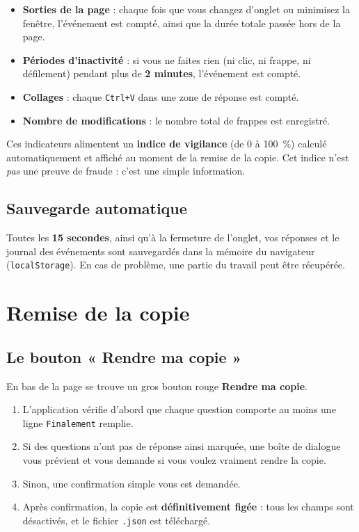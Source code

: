 \documentclass[11pt,a4paper]{article}
\begin{document}
\begin{itemize}
  \item \textbf{Sorties de la page} : chaque fois que vous changez d'onglet ou
        minimisez la fenêtre, l'événement est compté, ainsi que la durée totale passée
        hors de la page.
  \item \textbf{Périodes d'inactivité} : si vous ne faites rien (ni clic, ni frappe,
        ni défilement) pendant plus de \textbf{2 minutes}, l'événement est compté.
  \item \textbf{Collages} : chaque \texttt{Ctrl+V} dans une zone de réponse est
        compté.
  \item \textbf{Nombre de modifications} : le nombre total de frappes est enregistré.
\end{itemize}

Ces indicateurs alimentent un \textbf{indice de vigilance} (de 0 à 100~\%)
calculé automatiquement et affiché au moment de la remise de la copie. Cet indice
n'est \emph{pas} une preuve de fraude : c'est une simple information.

\subsection{Sauvegarde automatique}

Toutes les \textbf{15 secondes}, ainsi qu'à la fermeture de l'onglet, vos réponses et
le journal des événements sont sauvegardés dans la mémoire du navigateur
(\texttt{localStorage}). En cas de problème, une partie du travail peut être
récupérée.

\section{Remise de la copie}

\subsection{Le bouton « Rendre ma copie »}

En bas de la page se trouve un gros bouton rouge \textbf{Rendre ma copie}.

\begin{enumerate}
  \item L'application vérifie d'abord que chaque question comporte au moins une ligne
        \texttt{Finalement} remplie.
  \item Si des questions n'ont pas de réponse ainsi marquée, une boîte de dialogue vous
        prévient et vous demande si vous voulez vraiment rendre la copie.
  \item Sinon, une confirmation simple vous est demandée.
  \item Après confirmation, la copie est \textbf{définitivement figée} :
        tous les champs sont désactivés, et le fichier \texttt{.json} est téléchargé.
\end{enumerate}
\end{document}
